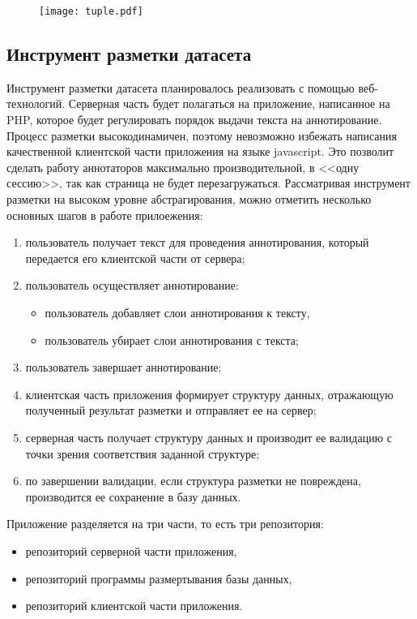 \documentclass[../main]{subfiles}
\begin{document}
\begin{figure}[H]
    \centering
    {\texttt{[image: tuple.pdf]}}
    \vspace{-\baselineskip}
\end{figure}

\subsection{Инструмент разметки датасета}
Инструмент разметки датасета планировалось реализовать с помощью веб-технологий. Серверная часть будет полагаться на приложение, написанное на PHP, которое будет регулировать порядок выдачи текста на аннотирование. Процесс разметки высокодинамичен, поэтому невозможно избежать написания качественной клиентской части приложения на языке javascript. Это позволит сделать работу аннотаторов максимально производительной, в <<одну сессию>>, так как страница не будет перезагружаться. Рассматривая инструмент разметки на высоком уровне абстрагирования, можно отметить несколько основных шагов в работе прилоежения:
\begin{enumerate}
    \item пользователь получает текст для проведения аннотирования, который передается его клиентской части от сервера;
    \item пользователь осуществляет аннотирование:
    \begin{itemize}
        \item пользователь добавляет слои аннотирования к тексту,
        \item пользователь убирает слои аннотирования с текста;
    \end{itemize}
    \item пользователь завершает аннотирование;
    \item клиентская часть приложения формирует структуру данных, отражающую полученный результат разметки и отправляет ее на сервер;
    \item серверная часть получает структуру данных и производит ее валидацию с точки зрения соответствия заданной структуре;
    \item по завершении валидации, если структура разметки не повреждена, производится ее сохранение в базу данных.
\end{enumerate}

Приложение разделяется на три части, то есть три репозитория:
\begin{itemize}
    \item репозиторий серверной части приложения,
    \item репозиторий программы размертывания базы данных,
    \item репозиторий клиентской части приложения.
\end{itemize}
\end{document}
